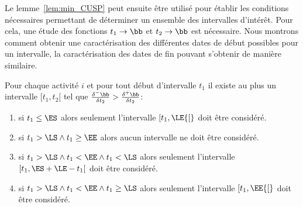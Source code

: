 Le lemme~\ref{lem:min_CUSP} peut ensuite être utilisé pour établir 
les conditions nécessaires permettant de déterminer un ensemble des
intervalles d'intérêt. Pour cela, une étude des fonctions $t_1
\rightarrow \bb$ et $t_2 \rightarrow \bb$ est nécessaire. Nous montrons
comment obtenir une caractérisation des différentes dates de début
possibles pour un intervalle, la caractérisation des dates de fin
pouvant s'obtenir de manière similaire.

\begin{lemma}
  Pour chaque activité $i$ et pour tout début d'intervalle $t_1$ il
  existe au plus un intervalle $[t_1,t_2[$ tel que
  $\frac{\delta^{-}\bb}{\delta t_2} >
  \frac{\delta^{+}\bb}{\delta t_2} $:
  \begin{enumerate}
  \item si $t_1 \le \ES$ alors seulement l'intervalle $[t_1,\LE {[}$ doit
    être considéré.
  \item si $t_1  > \LS \land t_1 \ge \EE$ alors aucun intervalle ne
    doit être considéré. 
  \item si $t_1  > \LS \land t_1 <\EE \land t_1 < \LS$ alors seulement
    l'intervalle $[t_1,\ES+\LE-t_1 [$ doit
    être considéré.
  \item si $t_1  > \LS \land t_1 <\EE \land t_1 \ge \LS$ alors
    seulement l'intervalle $[t_1,\EE {[}$ doit
    être considéré.
  \end{enumerate}
\end{lemma}

